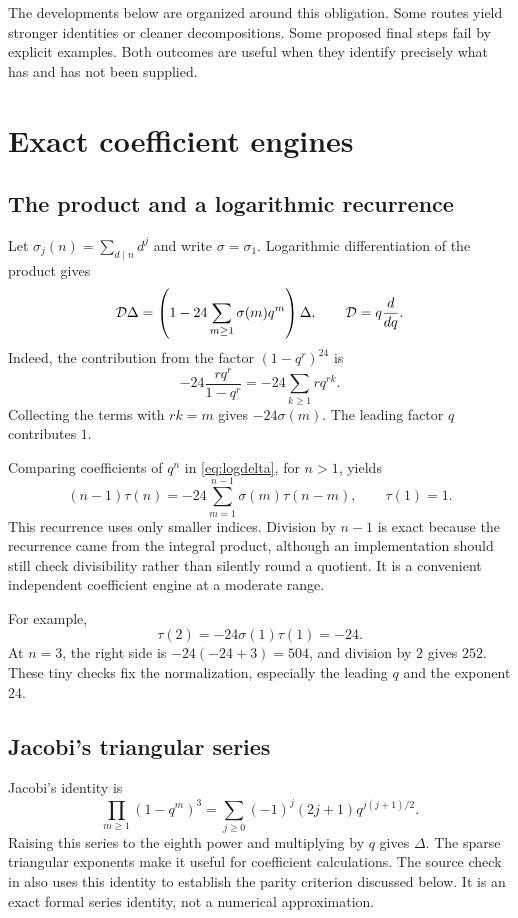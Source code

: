 The developments below are organized around this obligation. Some routes yield stronger identities or cleaner decompositions. Some proposed final steps fail by explicit examples. Both outcomes are useful when they identify precisely what has and has not been supplied.

\chapter{Exact coefficient engines}\label{ch:engines}
\section{The product and a logarithmic recurrence}
Let $\sigma_j(n)=\sum_{d\mid n}d^j$ and write $\sigma=\sigma_1$. Logarithmic differentiation of the product gives
\begin{equation}\label{eq:logdelta}
\mathcal D\Delta=\left(1-24\sum_{m\ge1}\sigma(m)q^m\right)\Delta,
\qquad \mathcal D=q\frac{d}{dq}.
\end{equation}
Indeed, the contribution from the factor $(1-q^r)^{24}$ is
\[
-24\frac{rq^r}{1-q^r}=-24\sum_{k\ge1}rq^{rk}.
\]
Collecting the terms with $rk=m$ gives $-24\sigma(m)$. The leading factor $q$ contributes $1$.

Comparing coefficients of $q^n$ in \eqref{eq:logdelta}, for $n>1$, yields
\begin{equation}\label{eq:logrec}
(n-1)\tau(n)=-24\sum_{m=1}^{n-1}\sigma(m)\tau(n-m),
\qquad \tau(1)=1.
\end{equation}
This recurrence uses only smaller indices. Division by $n-1$ is exact because the recurrence came from the integral product, although an implementation should still check divisibility rather than silently round a quotient. It is a convenient independent coefficient engine at a moderate range.

For example,
\[
\tau(2)=-24\sigma(1)\tau(1)=-24.
\]
At $n=3$, the right side is $-24(-24+3)=504$, and division by $2$ gives $252$. These tiny checks fix the normalization, especially the leading $q$ and the exponent $24$.

\section{Jacobi's triangular series}
Jacobi's identity is
\begin{equation}\label{eq:jacobi}
\prod_{m\ge1}(1-q^m)^3
=\sum_{j\ge0}(-1)^j(2j+1)q^{j(j+1)/2}.
\end{equation}
Raising this series to the eighth power and multiplying by $q$ gives $\Delta$. The sparse triangular exponents make it useful for coefficient calculations. The source check in \cite{BCO} also uses this identity to establish the parity criterion discussed below. It is an exact formal series identity, not a numerical approximation.

